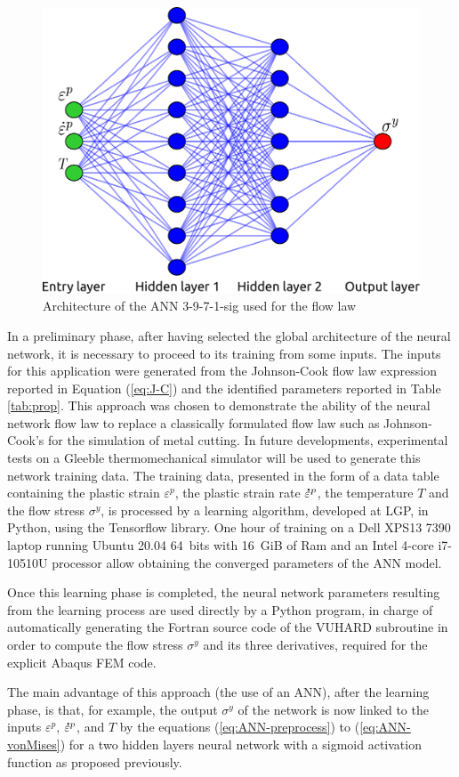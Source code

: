 \documentclass[preprint,12pt,times]{elsarticle}
\newcommand{\mdot}[1]{\accentset{\mbox{\bfseries .}}{#1}} %
\begin{document}
\begin{figure}[!h]
\centering
\includegraphics[width = 90 mm]{Figures/ANN}
\caption{Architecture of the ANN 3-9-7-1-sig used for the flow law}
\label{fig:ANN}
\end{figure}

In a preliminary phase, after having selected the global architecture of the neural network, it is necessary to proceed to its training from some inputs.
The inputs for this application were generated from the Johnson-Cook flow law expression reported in Equation (\ref{eq:J-C}) and the identified parameters reported in Table \ref{tab:prop}. This approach was chosen to demonstrate the ability of the neural network flow law to replace a classically formulated flow law such as Johnson-Cook's for the simulation of metal cutting. In future developments, experimental tests on a Gleeble thermomechanical simulator will be used to generate this network training data. The training data, presented in the form of a data table containing the plastic strain $\varepsilon^p$, the plastic strain rate $\mdot{\varepsilon}^p$, the temperature $T$ and the flow stress $\sigma^y$, is processed by a learning algorithm, developed at LGP, in Python, using the Tensorflow library. One hour of training on a Dell XPS13 7390 laptop running Ubuntu 20.04 64~bits with 16~GiB of Ram and an Intel 4-core i7-10510U processor allow obtaining the converged parameters of the ANN model.

Once this learning phase is completed, the neural network parameters resulting from the learning process are used directly by a Python program, in charge of automatically generating the Fortran source code of the VUHARD subroutine in order to compute the flow stress $\sigma^y$ and its three derivatives, required for the explicit Abaqus FEM code.

The main advantage of this approach (the use of an ANN), after the learning phase, is that, for example, the output $\sigma^y$ of the network is now linked to the inputs $\varepsilon^p$, $\mdot{\varepsilon}^p$, and $T$ by the equations (\ref{eq:ANN-preprocess}) to (\ref{eq:ANN-vonMises}) for a two hidden layers neural network with a sigmoid activation function as proposed previously.
\end{document}

